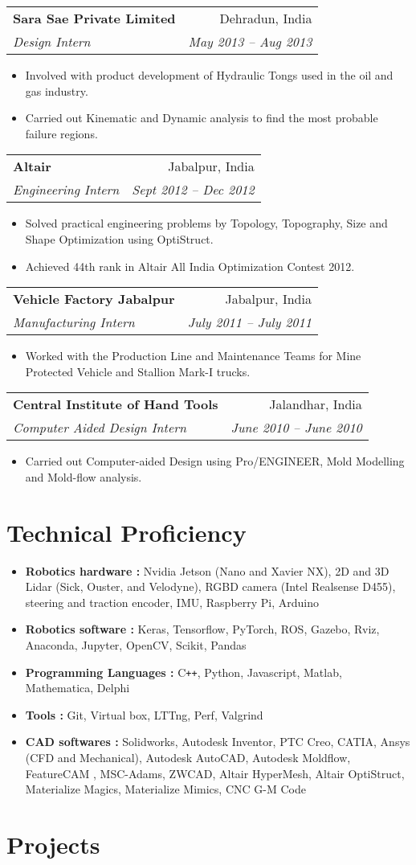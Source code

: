 \documentclass[letterpaper,10pt]{article}
\makeatletter
\newcommand{\resumeHeading}[4]{
  \vspace{-1pt}
    \begin{tabular*}{0.97\textwidth}{l@{\extracolsep{\fill}}r}
      \textbf{#1} & #2 \vspace{-2pt}\\ \vspace{1pt}
      \textit{\small#3} & \textit{\small #4} \\
    \end{tabular*}
}
\newcommand{\resumeSection}[1]{
\vspace{-12pt}
\section{\textbf{#1}}
}
\newcommand{\resumeItemListStart}{
\vspace{-7pt}
\begin{itemize}[leftmargin=14pt]
}
\newcommand{\resumeItemListEnd}{
\vspace{+7pt}
\end{itemize}
}
\newcommand{\resumeItem}[1]{
  \item\small{
      {#1 \vspace{-7pt}
      }
  }
}
\makeatother
\begin{document}
\resumeHeading
{Sara Sae Private Limited}{Dehradun, India}
{Design Intern}{May 2013 -- Aug 2013}
\resumeItemListStart
\resumeItem{Involved with product development of Hydraulic Tongs used in the oil and gas industry.}
\resumeItem{Carried out Kinematic and Dynamic analysis to find the most probable failure regions.}
\resumeItemListEnd

\resumeHeading
{Altair}{Jabalpur, India}
{Engineering Intern}{Sept 2012 -- Dec 2012}
\resumeItemListStart
\resumeItem{Solved practical engineering problems by Topology, Topography, Size and Shape Optimization using OptiStruct. }
\resumeItem{Achieved 44th rank in Altair All India Optimization Contest 2012.}
\resumeItemListEnd

\resumeHeading
{Vehicle Factory Jabalpur}{Jabalpur, India}
{Manufacturing Intern}{July 2011 -- July 2011}
\resumeItemListStart
\resumeItem{Worked with the Production Line and Maintenance Teams for Mine Protected Vehicle and Stallion Mark-I trucks.}
\resumeItemListEnd

\resumeHeading
{Central Institute of Hand Tools}{Jalandhar, India}
{Computer Aided Design Intern}{June 2010 -- June 2010}
\resumeItemListStart
\resumeItem{Carried out Computer-aided Design using Pro/ENGINEER, Mold Modelling and Mold-flow analysis.}
\resumeItemListEnd



\resumeSection{Technical Proficiency}
    \vspace{+7pt}
    \resumeItemListStart
    \resumeItem{\textbf{Robotics hardware :}  Nvidia Jetson (Nano and Xavier NX), 2D and 3D Lidar (Sick, Ouster, and Velodyne), RGBD camera (Intel Realsense D455), steering and traction encoder, IMU, Raspberry Pi, Arduino}
    \resumeItem{\textbf{Robotics software :} Keras, Tensorflow, PyTorch, ROS, Gazebo, Rviz, Anaconda, Jupyter, OpenCV, Scikit, Pandas}
    \resumeItem{\textbf{Programming Languages :} C\texttt{++}, Python, Javascript, Matlab, Mathematica, Delphi}
    \resumeItem{\textbf{Tools :} Git, Virtual box, LTTng, Perf, Valgrind}
    \resumeItem{\textbf{CAD softwares :} Solidworks, Autodesk Inventor, PTC Creo, CATIA, Ansys (CFD and Mechanical), Autodesk AutoCAD, Autodesk Moldflow, FeatureCAM , MSC-Adams, ZWCAD, Altair HyperMesh, Altair OptiStruct, Materialize Magics, Materialize Mimics, CNC G-M Code}
    \resumeItemListEnd



\resumeSection{Projects}
\end{document}
